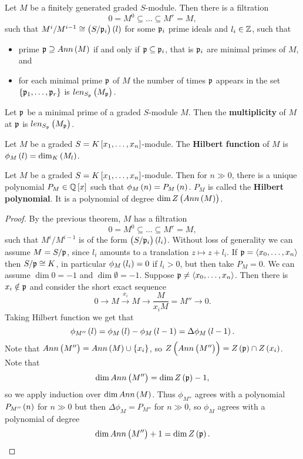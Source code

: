 \begin{theorem}
Let $ M $ be a finitely generated graded $ S $-module. Then there is a filtration
$$ 0 = M^0 \subseteq \dots \subseteq M^r = M, $$
such that $ M^i / M^{i - 1} \cong \br{S / \ppp_i}\br{l} $ for some $ \mathfrak{p}_i $ prime ideals and $ l_i \in \mathbb{Z} $, such that
\begin{itemize}
\item prime $ \ppp \supseteq Ann\br{M} $ if and only if $ \mathfrak{p} \subseteq \mathfrak{p}_i $, that is $ \mathfrak{p}_i $ are minimal primes of $ M $, and
\item for each minimal prime $ \mathfrak{p} $ of $ M $ the number of times $ \mathfrak{p} $ appears in the set $ \cbr{\ppp_1, \dots, \ppp_r} $ is $ len_{S_\ppp}\br{M_\ppp} $.
\end{itemize}
\end{theorem}


\begin{definition}
Let $ \mathfrak{p} $ be a minimal prime of a graded $ S $-module $ M $. Then the \textbf{multiplicity} of $ M $ at $ \mathfrak{p} $ is $ len_{S_\ppp}\br{M_\ppp} $.
\end{definition}

\begin{definition}
Let $ M $ be a graded $ S = K\sbr{x_1, \dots, x_n} $-module. The \textbf{Hilbert function} of $ M $ is $ \phi_M\br{l} = \dim_K\br{M_l} $.
\end{definition}

\begin{theorem}
Let $ M $ be a graded $ S = K\sbr{x_1, \dots, x_n} $-module. Then for $ n \gg 0 $, there is a unique polynomial $ P_M \in \QQ\sbr{x} $ such that $ \phi_M\br{n} = P_M\br{n} $. $ P_M $ is called the \textbf{Hilbert polynomial}. It is a polynomial of degree $ \dim Z\br{Ann\br{M}} $.
\end{theorem}

\begin{proof}
By the previous theorem, $ M $ has a filtration
$$ 0 = M^0 \subseteq \dots \subseteq M^r = M, $$
such that $ M^i / M^{i - 1} $ is of the form $ \br{S / \ppp_i}\br{l_i} $. Without loss of generality we can assume $ M = S / \mathfrak{p} $, since $ l_i $ amounts to a translation $ z \mapsto z + l_i $. If $ \mathfrak{p} = \left\langle x_0, \dots, x_n \right\rangle $ then $ S / \mathfrak{p} \cong K $, in particular $ \phi_M\br{l_i} = 0 $ if $ l_i > 0 $, but then take $ P_M = 0 $. We can assume $ \dim 0 = -1 $ and $ \dim \emptyset = -1 $. Suppose $ \mathfrak{p} \ne \left\langle x_0, \dots, x_n \right\rangle $. Then there is $ x_i \notin \mathfrak{p} $ and consider the short exact sequence
$$ 0 \to M \xrightarrow{x_i} M \to \dfrac{M}{x_iM} = M'' \to 0. $$
Taking Hilbert function we get that
$$ \phi_{M''}\br{l} = \phi_M\br{l} - \phi_M\br{l - 1} = \Delta\phi_M\br{l - 1}. $$
Note that $ Ann\br{M''} = Ann\br{M} \cup \cbr{x_i} $, so $ Z\br{Ann\br{M''}} = Z\br{\ppp} \cap Z\br{x_i} $. Note that
$$ \dim Ann\br{M''} = \dim Z\br{\ppp} - 1, $$
so we apply induction over $ \dim Ann\br{M} $. Thus $ \phi_{M''} $ agrees with a polynomial $ P_{M''}\br{n} $ for $ n \gg 0 $ but then $ \Delta\phi_M = P_{M''} $ for $ n \gg 0 $, so $ \phi_M $ agrees with a polynomial of degree
$$ \dim Ann\br{M''} + 1 = \dim Z\br{\ppp}. $$
\end{proof}

